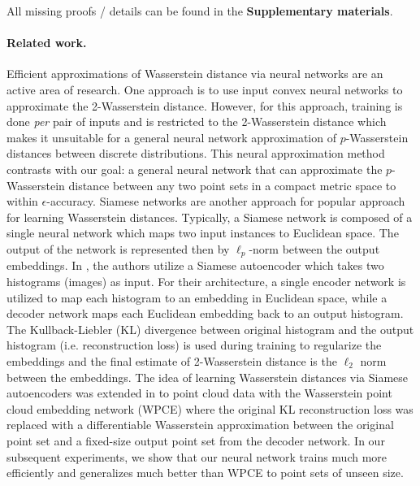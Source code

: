 \documentclass[12pt]{article}
\newcommand{\yusu}[1]		{{ \textcolor{darkgreen} {{\sc [Yusu]:} #1}}}
\newcommand{\yusuedit}[1] {{\textcolor{darkred}{#1}}}
\newcommand{\samedit}[1]{{{\textcolor{darkblue}{#1}}}}
\begin{document}
All missing proofs / details can be found in the {\bf Supplementary materials}. 



\paragraph{Related work.} Efficient approximations of Wasserstein distance via neural networks are an active area of research. 
One approach is to use input convex neural networks to approximate the 2-Wasserstein distance\citep{makkuva2020optimal, taghvaei20192}. However, for this approach, training is done \textit{per} pair of inputs and is restricted to the 2-Wasserstein distance  which makes it unsuitable for a general neural network approximation of $p$-Wasserstein distances between discrete distributions. 
This neural approximation method contrasts with our goal: a general neural network that can approximate the $p$-Wasserstein distance between any two point sets in a compact metric space to within $\epsilon$-accuracy. 
Siamese networks are another approach for popular approach for learning Wasserstein distances. Typically, a Siamese network is composed of a single neural network which maps two input instances to Euclidean space. The output of the network is represented then by $\ell_p$-norm between the output embeddings. In \citep{courty2017learning}, the authors utilize a Siamese autoencoder which takes two histograms (images) as input. For their architecture, a single encoder network is utilized to map each histogram to an embedding in Euclidean space, while a decoder network maps each Euclidean embedding back to an output histogram. 
The Kullback-Liebler (KL) divergence between original histogram and the output histogram (i.e. reconstruction loss) is used during training to regularize the embeddings and the final estimate of 2-Wasserstein distance is the $\ell_2$ norm between the embeddings.
The idea of learning Wasserstein distances via Siamese autoencoders was extended in \citep{kawano2020learning} to point cloud data with the Wasserstein point cloud embedding network (WPCE) where the original KL reconstruction loss was replaced with a differentiable Wasserstein approximation between the original point set and a fixed-size output point set from the decoder network. 
In our subsequent experiments, we show that our neural network trains much more efficiently and generalizes much better than WPCE to point sets of unseen size.
\end{document}
